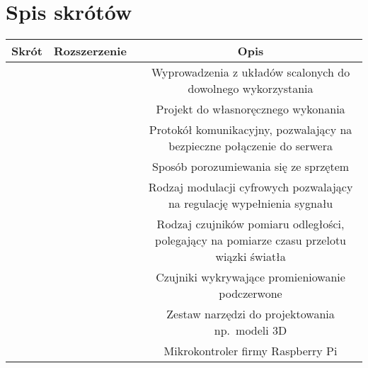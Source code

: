 \section*{Spis skrótów}
\begin{table*}[!ht]
    \begin{tabularx}{\textwidth}{|c|C|C|}\hline
        Skrót & Rozszerzenie\ & Opis\\\hline
               &  & Wyprowadzenia z układów scalonych do dowolnego wykorzystania\\\hline
                &  & Projekt do własnoręcznego wykonania\\\hline
                &  & Protokół komunikacyjny, pozwalający na bezpieczne połączenie do serwera\\\hline
                &  & Sposób porozumiewania się ze sprzętem\\\hline
                &  & Rodzaj modulacji cyfrowych pozwalający na regulację wypełnienia sygnału\\\hline
                &  & Rodzaj czujników pomiaru odległości, polegający na pomiarze czasu przelotu wiązki światła\\\hline
                 &  & Czujniki wykrywające promieniowanie podczerwone\\\hline
                &  & Zestaw narzędzi do projektowania np.~modeli 3D\\\hline
         &  & Mikrokontroler firmy Raspberry Pi\\\hline
    \end{tabularx}
\end{table*}